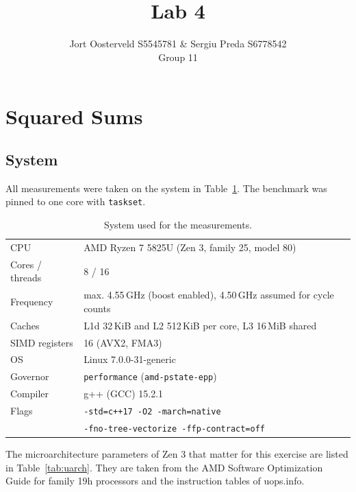 \documentclass[a4paper,11pt]{article}
\title{\Large{\sc{Performance Engineering}}\\[2mm] Lab 4}
\author{Jort Oosterveld S5545781 \& Sergiu Preda S6778542 \\ Group 11}
\begin{document}
\setlength\parindent{0pt}

\maketitle

\section{Squared Sums}

\subsection{System}

All measurements were taken on the system in Table~\ref{tab:system}. The
benchmark was pinned to one core with \texttt{taskset}.

\begin{table}[ht]
    \centering
    \caption{System used for the measurements.}
    \label{tab:system}
    \begin{tabular}{ll}
        \hline
        CPU & AMD Ryzen 7 5825U (Zen 3, family 25, model 80) \\
        Cores / threads & 8 / 16 \\
        Frequency & max. 4.55\,GHz (boost enabled), 4.50\,GHz assumed for cycle counts \\
        Caches & L1d 32\,KiB and L2 512\,KiB per core, L3 16\,MiB shared \\
        SIMD registers & 16 (AVX2, FMA3) \\
        OS & Linux 7.0.0-31-generic \\
        Governor & \texttt{performance} (\texttt{amd-pstate-epp}) \\
        Compiler & g++ (GCC) 15.2.1 \\
        Flags & \texttt{-std=c++17 -O2 -march=native} \\
              & \texttt{-fno-tree-vectorize -ffp-contract=off} \\
        \hline
    \end{tabular}
\end{table}

The microarchitecture parameters of Zen 3 that matter for this exercise are
listed in Table~\ref{tab:uarch}. They are taken from the AMD Software
Optimization Guide for family 19h processors and the instruction tables of
uops.info.
\end{document}
